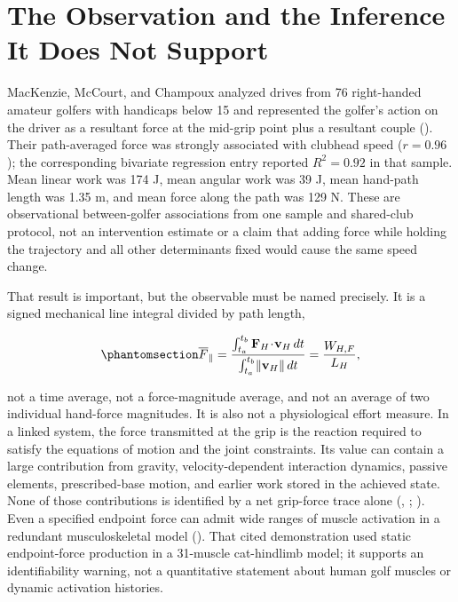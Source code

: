 \documentclass[
  letterpaper,
]{report}
\begin{document}
\section{The Observation and the Inference It Does Not
Support}\label{sec-hand-path-observation}

MacKenzie, McCourt, and Champoux analyzed drives from 76 right-handed
amateur golfers with handicaps below 15 and represented the golfer's
action on the driver as a resultant force at the mid-grip point plus a
resultant couple (). Their path-averaged force was strongly associated
with clubhead speed (\(r=0.96\)); the corresponding bivariate regression
entry reported \(R^2=0.92\) in that sample. Mean linear work was 174 J,
mean angular work was 39 J, mean hand-path length was 1.35 m, and mean
force along the path was 129 N. These are observational between-golfer
associations from one sample and shared-club protocol, not an
intervention estimate or a claim that adding force while holding the
trajectory and all other determinants fixed would cause the same speed
change.

That result is important, but the observable must be named precisely. It
is a signed mechanical line integral divided by path length,

\begin{equation}\phantomsection\label{eq-mackenzie-estimand}{
\overline F_{\parallel}
=\frac{\int_{t_a}^{t_b}\mathbf F_H\!\cdot\!\mathbf v_H\,dt}
       {\int_{t_a}^{t_b}\lVert\mathbf v_H\rVert\,dt}
=\frac{W_{H,F}}{L_H},
}\end{equation}

not a time average, not a force-magnitude average, and not an average of
two individual hand-force magnitudes. It is also not a physiological
effort measure. In a linked system, the force transmitted at the grip is
the reaction required to satisfy the equations of motion and the joint
constraints. Its value can contain a large contribution from gravity,
velocity-dependent interaction dynamics, passive elements,
prescribed-base motion, and earlier work stored in the achieved state.
None of those contributions is identified by a net grip-force trace
alone (,
; ). Even a specified endpoint force can admit wide ranges of
muscle activation in a redundant musculoskeletal model
(). That cited
demonstration used static endpoint-force production in a 31-muscle
cat-hindlimb model; it supports an identifiability warning, not a
quantitative statement about human golf muscles or dynamic activation
histories.
\end{document}
